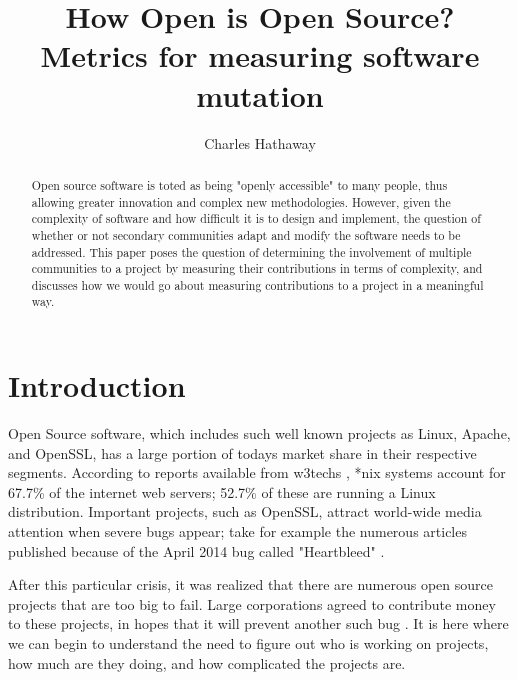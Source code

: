 \documentclass[]{article}
\title{How Open is Open Source? Metrics for measuring software mutation}
\author{Charles Hathaway}
\begin{document}
\maketitle

\begin{abstract}

Open source software is toted as being "openly accessible" to many people, thus allowing greater innovation and complex new methodologies.
However, given the complexity of software and how difficult it is to design and implement, the question of whether or not secondary communities adapt and modify the software needs to be addressed.
This paper poses the question of determining the involvement of multiple communities to a project by measuring their contributions in terms of complexity, and discusses how we would go about measuring contributions to a project in a meaningful way.

\end{abstract}

\section{Introduction}


Open Source software, which includes such well known projects as Linux, Apache, and OpenSSL, has a large portion of todays market share in their respective segments.
According to reports available from w3techs \cite{w3techs2015usage}, *nix systems account for 67.7\% of the internet web servers; 52.7\% of these are running a Linux distribution. 
Important projects, such as OpenSSL, attract world-wide media attention when severe bugs appear; take for example the numerous articles published because of the April 2014 bug called "Heartbleed" \cite{mitre2013heartbleed}  \cite{whittaker2014heartbleed}.

After this particular crisis, it was realized that there are numerous open source projects that are too big to fail.
Large corporations agreed to contribute money to these projects, in hopes that it will prevent another such bug \cite{brodkin2014heartbleed}.
It is here where we can begin to understand the need to figure out who is working on projects, how much are they doing, and how complicated the projects are.
\end{document}
